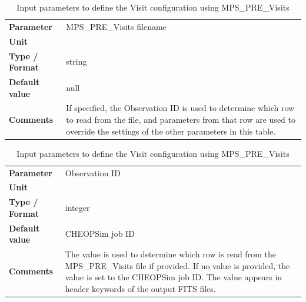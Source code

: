 \documentclass[11pt]{article}      %
\def\HCode#1{}
\def\htmlanchor#1{\HCode{<a id="#1"></a>}}
\begin{document}
\begin{table}[hb]
  \caption{Input parameters to define the Visit configuration using MPS\_PRE\_Visits}

  \htmlanchor{visitFile}
  \begin{tabular}{| l | p{13cm} |}
    \hline 
    {\bf Parameter} & MPS\_PRE\_Visits filename\\
    {\bf Unit} & \\
    {\bf Type / Format} & string\\
    {\bf Default value} & null\\
    {\bf Comments} & If specified, the Observation ID is used to determine which row to read from the file, and parameters from that row are used to override the settings of the other parameters in this table.\\
    \hline
  \end{tabular}
  \bigskip

  \htmlanchor{obsId}
  \begin{tabular}{| l | p{13cm} |}
    \hline
    {\bf Parameter} &  Observation ID\\
    {\bf Unit} & \\
    {\bf Type / Format} & integer\\
    {\bf Default value} & CHEOPSim job ID\\
    {\bf Comments} & The value is used to determine which row is read from the MPS\_PRE\_Visits file if provided. If no value is provided, the value is set to the CHEOPSim job ID. The value appears in header keywords of the output FITS files.\\
    \hline
  \end{tabular}
  \bigskip

  \label{tab:time1}
\end{table}
\end{document}
